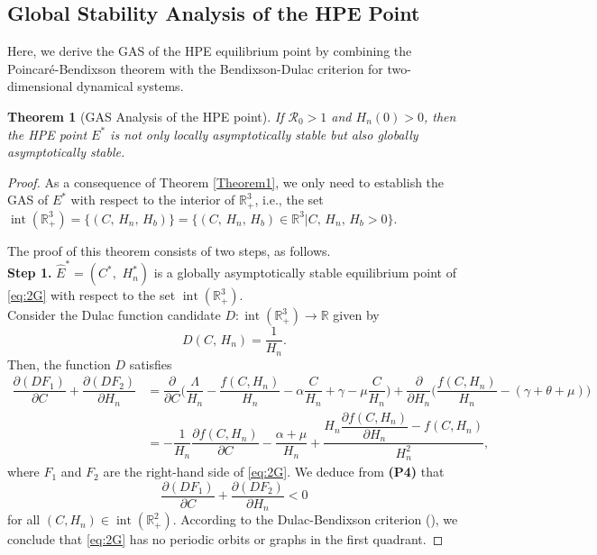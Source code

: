 \documentclass[11pt]{article}
\newtheorem{theorem}{Theorem}[section]
\theoremstyle{definition}
\theoremstyle{remark}
\numberwithin{equation}{section}
\DeclareMathOperator{\interior}{int}
\begin{document}
\subsection{Global Stability Analysis of the HPE Point}
Here, we derive the GAS of the HPE equilibrium point by combining the Poincar\'e-Bendixson theorem with the Bendixson-Dulac criterion for two-dimensional dynamical systems.
\begin{theorem}[GAS Analysis of the HPE point]\label{Theorem4}
If $\mathcal{R}_0 > 1$ and $H_n(0) > 0$, then the HPE point $E^*$ is not only locally asymptotically stable but also globally asymptotically stable.
\end{theorem}
\begin{proof}
As a consequence of Theorem \ref{Theorem1}, we only need to establish the GAS of $E^*$ with respect to the interior of $\mathbb{R}_+^3$, i.e., the set $\interior(\mathbb{R}_+^3) = \{(C,\,H_n,\,H_b)\} = \{(C,\,H_n,\,H_b) \in \mathbb{R}^3|C,\,H_n,\,H_b > 0\}$.

The proof of this theorem consists of two steps, as follows.\\
\textbf{Step 1.} $\widehat{E}^* = (C^*,\,\,H_n^*)$ is a globally asymptotically stable equilibrium point of \eqref{eq:2G} with respect to the set $\interior(\mathbb{R}_+^3)$.\\
Consider the Dulac function candidate $D\colon\interior(\mathbb{R}_+^3) \to \mathbb{R}$ given by
\begin{equation}\label{eq:22}
    D(C,\,H_n) = \dfrac{1}{H_n}.
\end{equation}
Then, the function $D$ satisfies
\begin{equation*}
\begin{split}
    \dfrac{\partial(DF_1)}{\partial C} + \dfrac{\partial(DF_2)}{\partial H_n} &= \dfrac{\partial}{\partial C}\bigg(\dfrac{\Lambda}{H_n} - \dfrac{f(C,H_n)}{H_n} - \alpha \dfrac{C}{H_n} + \gamma - \mu\dfrac{C}{H_n}\bigg) + \dfrac{\partial}{\partial H_n}\bigg(\dfrac{f(C,H_n)}{H_n} - (\gamma + \theta + \mu)\bigg)\\
    &= - \dfrac{1}{H_n}\dfrac{\partial f(C, H_n)}{\partial C} - \dfrac{\alpha + \mu}{H_n} + \dfrac{H_n\dfrac{\partial f(C, H_n)}{\partial H_n} - f(C, H_n)}{H_n^2},
\end{split}
\end{equation*}
where $F_1$ and $F_2$ are the right-hand side of \eqref{eq:2G}. We deduce from \textbf{(P4)} that
\begin{equation*}
     \dfrac{\partial(DF_1)}{\partial C} + \dfrac{\partial(DF_2)}{\partial H_n} < 0 
\end{equation*}
for all $(C, H_n) \in\interior(\mathbb{R}_+^2)$. 
According to the Dulac-Bendixson criterion (\cite[Theorem 3.6]{Martcheva}), we
conclude that \eqref{eq:2G} has no periodic orbits or graphs in the first quadrant.


\end{proof}
\end{document}
